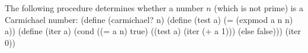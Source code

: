 The following procedure determines whether a number $n$ (which is not prime) is a Carmichael number:
\begtt\scm
(define (carmichael? n)
  (define (test a)
    (= (expmod a n n) a))
  (define (iter a)
    (cond ((= a n) true)
          ((test a) (iter (+ a 1)))
          (else false)))
  (iter 0))
\endtt
